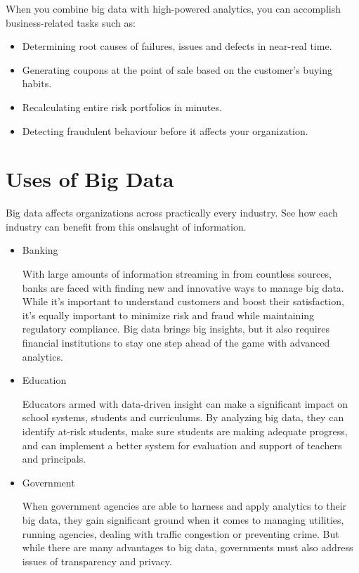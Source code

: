 When you combine big data with high-powered analytics, you can accomplish business-related tasks such as:
\begin{itemize}
\item Determining root causes of failures, issues and defects in near-real time.
\item Generating coupons at the point of sale based on the customer’s buying habits.
\item Recalculating entire risk portfolios in minutes.
\item Detecting fraudulent behaviour before it affects your organization.
\end{itemize}

\section{Uses of Big Data}
Big data affects organizations across practically every industry. See how each industry can benefit from this onslaught of information.
\begin{itemize}
\item Banking


With large amounts of information streaming in from countless sources, banks are faced with finding new and innovative ways to manage big data. While it’s important to understand customers and boost their satisfaction, it’s equally important to minimize risk and fraud while maintaining regulatory compliance. Big data brings big insights, but it also requires financial institutions to stay one step ahead of the game with advanced analytics.

\item Education


Educators armed with data-driven insight can make a significant impact on school systems, students and curriculums. By analyzing big data, they can identify at-risk students, make sure students are making adequate progress, and can implement a better system for evaluation and support of teachers and principals.

\item Government


When government agencies are able to harness and apply analytics to their big data, they gain significant ground when it comes to managing utilities, running agencies, dealing with traffic congestion or preventing crime. But while there are many advantages to big data, governments must also address issues of transparency and privacy.
\end{itemize}

